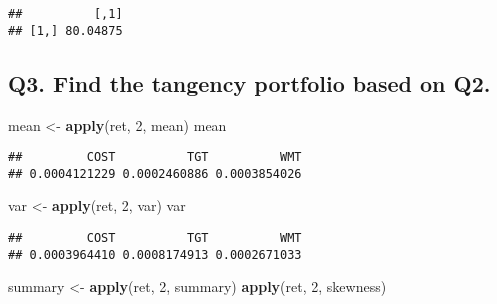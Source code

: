 \documentclass[]{article}
\newenvironment{Shaded}{\begin{snugshade}}{\end{snugshade}}
\newcommand{\DecValTok}[1]{\textcolor[rgb]{0.00,0.00,0.81}{#1}}
\newcommand{\KeywordTok}[1]{\textcolor[rgb]{0.13,0.29,0.53}{\textbf{#1}}}
\newcommand{\NormalTok}[1]{#1}
\newcommand{\OperatorTok}[1]{\textcolor[rgb]{0.81,0.36,0.00}{\textbf{#1}}}
\newcommand{\StringTok}[1]{\textcolor[rgb]{0.31,0.60,0.02}{#1}}
\begin{document}
\begin{Shaded}
\end{Shaded}

\begin{verbatim}
##          [,1]
## [1,] 80.04875
\end{verbatim}

\hypertarget{q3.-find-the-tangency-portfolio-based-on-q2.}{%
\subsection{Q3. Find the tangency portfolio based on
Q2.}\label{q3.-find-the-tangency-portfolio-based-on-q2.}}

\begin{Shaded}
\begin{Highlighting}[]
\NormalTok{mean <-}\StringTok{ }\KeywordTok{apply}\NormalTok{(ret, }\DecValTok{2}\NormalTok{, mean)}
\NormalTok{mean}
\end{Highlighting}
\end{Shaded}

\begin{verbatim}
##         COST          TGT          WMT 
## 0.0004121229 0.0002460886 0.0003854026
\end{verbatim}

\begin{Shaded}
\begin{Highlighting}[]
\NormalTok{var <-}\StringTok{ }\KeywordTok{apply}\NormalTok{(ret, }\DecValTok{2}\NormalTok{, var)}
\NormalTok{var}
\end{Highlighting}
\end{Shaded}

\begin{verbatim}
##         COST          TGT          WMT 
## 0.0003964410 0.0008174913 0.0002671033
\end{verbatim}

\begin{Shaded}
\begin{Highlighting}[]
\NormalTok{summary <-}\StringTok{ }\KeywordTok{apply}\NormalTok{(ret, }\DecValTok{2}\NormalTok{, summary)}
\KeywordTok{apply}\NormalTok{(ret, }\DecValTok{2}\NormalTok{, skewness)}
\end{Highlighting}
\end{Shaded}
\end{document}
